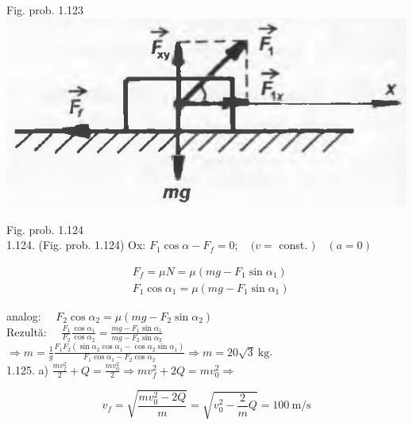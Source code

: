 \documentclass[10pt]{article}
\begin{document}
Fig. prob. 1.123\\
\includegraphics[max width=\textwidth, center]{2025_07_01_5b3ff9fa0d508c8e9f17g-224(1)}

Fig. prob. 1.124\\
1.124. (Fig. prob. 1.124) Ox: $F_{1} \cos \alpha-F_{f}=0 ; \quad(v=$ const. $) \quad(a=0)$

$$
\begin{aligned}
& F_{f}=\mu N=\mu\left(m g-F_{1} \sin \alpha_{1}\right) \\
& F_{1} \cos \alpha_{1}=\mu\left(m g-F_{1} \sin \alpha_{1}\right)
\end{aligned}
$$

analog: $\quad F_{2} \cos \alpha_{2}=\mu\left(m g-F_{2} \sin \alpha_{2}\right)$\\
Rezultă: $\quad \frac{F_{1}}{F_{2}} \frac{\cos \alpha_{1}}{\cos \alpha_{2}}=\frac{m g-F_{1} \sin \alpha_{1}}{m g-F_{2} \sin \alpha_{2}}$\\
$\Rightarrow m=\frac{1}{g} \frac{F_{1} F_{2}\left(\sin \alpha_{2} \cos \alpha_{1}-\cos \alpha_{2} \sin \alpha_{1}\right)}{F_{1} \cos \alpha_{1}-F_{2} \cos \alpha_{2}} \Rightarrow m=20 \sqrt{3} \mathrm{~kg}$.\\
1.125. a) $\frac{m v_{f}^{2}}{2}+Q=\frac{m v_{0}^{2}}{2} \Rightarrow m v_{f}^{2}+2 Q=m v_{0}^{2} \Rightarrow$

$$
v_{f}=\sqrt{\frac{m v_{0}^{2}-2 Q}{m}}=\sqrt{v_{0}^{2}-\frac{2}{m} Q}=100 \mathrm{~m} / \mathrm{s}
$$
\end{document}
